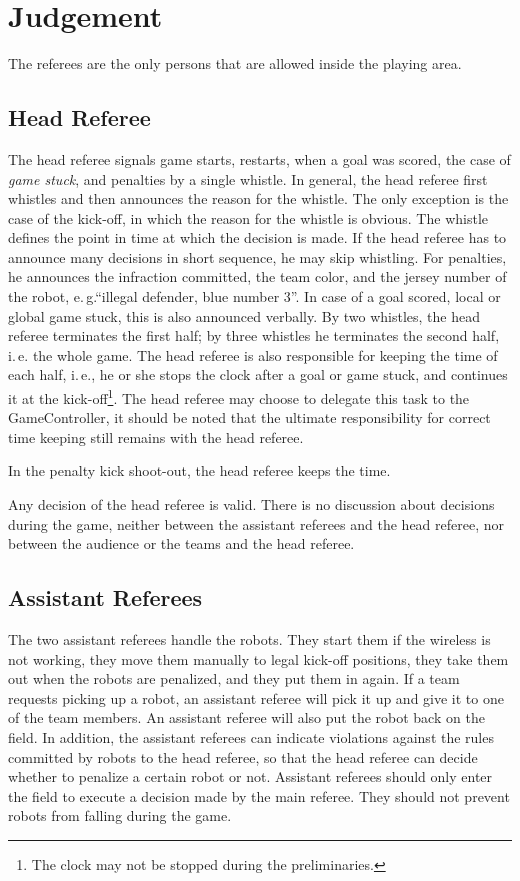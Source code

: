 \documentclass[12pt]{article}
\newcommand{\ie}{\mbox{i.\,e.}\xspace}
\newcommand{\eg}{\mbox{e.\,g.}\xspace}
\begin{document}
\section{Judgement}

The referees are the only persons that are allowed inside the playing area.

\subsection{Head Referee}

The head referee signals game starts, restarts, when a goal was scored, the case of \emph{game stuck}, and penalties by a single whistle. In general, the head referee first whistles and then announces the reason for the whistle. The only exception is the case of the kick-off, in which the reason for the whistle is obvious. The whistle defines the point in time at which the decision is made. If the head referee has to announce many decisions in short sequence, he may skip whistling. For penalties, he announces the infraction committed, the team color, and the jersey number of the robot, \eg ``illegal defender, blue number 3''. In case of a goal scored, local or global game stuck, this is also announced verbally. By two whistles, the head referee terminates the first half; by three whistles he terminates the second half, \ie the whole game. The head referee is also responsible for keeping the time of each half, \ie, he or she stops the clock after a goal or game stuck, and continues it at the kick-off\footnote{The clock may not be stopped during the preliminaries.}. The head referee may choose to delegate this task to the GameController, it should be noted that the ultimate responsibility for correct time keeping still remains with the head referee.

In the penalty kick shoot-out, the head referee keeps the time.

Any decision of the head referee is valid. There is no discussion about decisions during the game, neither between the assistant referees and the head referee, nor between the audience or the teams and the head referee.

\subsection{Assistant Referees}

The two assistant referees handle the robots. They start them if the wireless is not working, they move them manually to legal kick-off positions, they take them out when the robots are penalized, and they put them in again. If a team requests picking up a robot, an assistant referee will pick it up and give it to one of the team members. An assistant referee will also put the robot back on the field. In addition, the assistant referees can indicate violations against the rules committed by robots to the head referee, so that the head referee can decide whether to penalize a certain robot or not. Assistant referees should only enter the field to execute a decision made by the main referee. They should not prevent robots from falling during the game.
\end{document}
